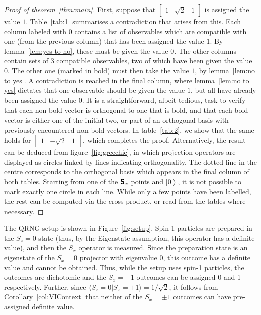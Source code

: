\documentclass[11pt, a4paper]{article}
\theoremstyle{definition}
\newcommand{\ket}[1]{\left| #1 \right>}
\newcommand{\iprod}[2]{\langle #1 | #2 \rangle}
\newcommand{\proj}[3]{\begin{smallmatrix} #1 & #2 & #3 \end{smallmatrix}}
\begin{document}
\begin{proof}[Proof of theorem~\ref{thm:main}]
First, suppose that $\left[\proj{1}{\sqrt{2}}{1}\right]$ is assigned the value $1$.
Table~\ref{tab:1} summarises a contradiction that arises from this.
Each column labeled with $0$ contains a list of observables which are compatible with one (from the previous column) that has been assigned the value $1$.
By lemma~\ref{lem:yes to no}, these must be given the value $0$.
The other columns contain sets of $3$ compatible observables, two of which have been given the value $0$.
The other one (marked in bold) must then take the value $1$, by lemma~\ref{lem:no to yes}.
A contradiction is reached in the final column, where lemma~\ref{lem:no to yes} dictates that one observable should be given the value $1$, but all have already been assigned the value $0$.
It is a straightforward, albeit tedious, task to verify that each non-bold vector is orthogonal to one that is bold, and that each bold vector is either one of the initial two, or part of an orthogonal basis with previously encountered non-bold vectors.
In table~\ref{tab:2}, we show that the same holds for $\left[\proj{1}{-\sqrt{2}}{1}\right]$, which completes the proof.
Alternatively, the result can be deduced from figure~\ref{fig:greechie}, in which projection operators are displayed as circles linked by lines indicating orthogonality.
The dotted line in the centre corresponds to the orthogonal basis which appears in the final column of both tables.
Starting from one of the $\textsf{\textbf{S}}_x$ points and $\ket{0}$, it is not possible to mark exactly one circle in each line.
While only a few points have been labelled, the rest can be computed via the cross product, or read from the tables where necessary.
\end{proof}
\pagebreak
\fi

The QRNG setup is shown in Figure~\ref{fig:setup}.
Spin-1 particles are prepared in the $S_z=0$ state (thus, by the Eigenstate assumption, this operator has a definite value), and then the $S_x$ operator is measured.
Since the preparation state is an eigenstate of the $S_x=0$ projector with eigenvalue 0, this outcome has a definite value and cannot be obtained.
Thus, while the setup uses spin-1 particles, the outcomes are dichotomic and the $S_x=\pm 1$ outcomes can be assigned 0 and 1 respectively.
Further, since $\iprod{S_z=0}{S_x=\pm 1}=1/\sqrt{2}$, it follows from Corollary~\ref{col:VIContext} that neither of the $S_x=\pm 1$ outcomes can have pre-assigned definite value.
\end{document}
